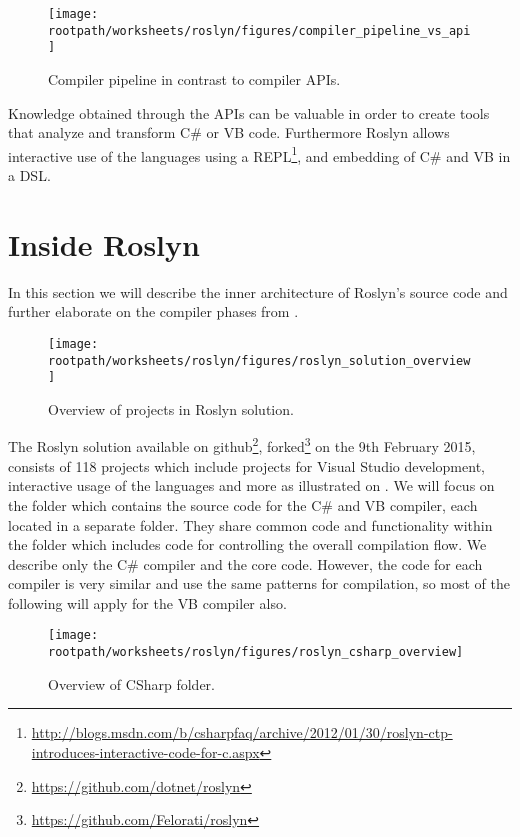 \begin{figure}[htbp]
\centering
 \texttt{[image: \\rootpath/worksheets/roslyn/figures/compiler\_pipeline\_vs\_api]} 
 \caption{Compiler pipeline in contrast to compiler \acp{API}\cite[p. 4]{ng2012roslyn}.}
\label{fig:api_vs_compiler_pipeline}
\end{figure}

Knowledge obtained through the \acp{API} can be valuable in order to create tools that analyze and transform C\# or \ac{VB} code. Furthermore Roslyn allows interactive use of the languages using a \acs{REPL}\footnote{\url{http://blogs.msdn.com/b/csharpfaq/archive/2012/01/30/roslyn-ctp-introduces-interactive-code-for-c.aspx}}, and embedding of  C\# and \ac{VB} in a \ac{DSL}\cite[p. 3]{ng2012roslyn}.

\section{Inside Roslyn}
In this section we will describe the inner architecture of Roslyn's source code and further elaborate on the compiler phases from .

\begin{figure}[htbp]
\centering
 \texttt{[image: \\rootpath/worksheets/roslyn/figures/roslyn\_solution\_overview]} 
 \caption{Overview of projects in Roslyn solution.}
\label{fig:roslyn_solution_overview}
\end{figure}

The Roslyn solution available on github\footnote{\url{https://github.com/dotnet/roslyn}}, forked\footnote{\url{https://github.com/Felorati/roslyn}} on the 9th February 2015, consists of 118 projects which include projects for Visual Studio development, interactive usage of the languages and more as illustrated on . We will focus on the  folder which contains the source code for the C\# and \ac{VB} compiler, each located in a separate folder. They share common code and functionality within the  folder which includes code for controlling the overall compilation flow. We describe only the C\# compiler and the core code. However, the code for each compiler is very similar and use the same patterns for compilation\cite[09:36-10:36]{campbellDeeperRos}, so most of the following will apply for the \ac{VB} compiler also.

\begin{figure}[htbp]
\centering
 \texttt{[image: \\rootpath/worksheets/roslyn/figures/roslyn\_csharp\_overview]} 
 \caption{Overview of CSharp folder.}
\label{fig:roslyn_csharp_overview}
\end{figure}

